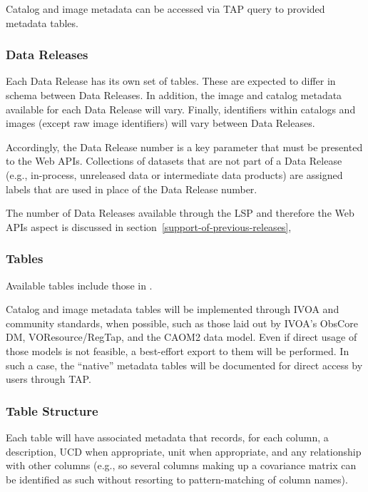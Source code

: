 Catalog and image metadata can be accessed via TAP query to provided
metadata tables.

\subsubsection{Data Releases}\label{data-releases}

Each Data Release has its own set of tables.  These are expected to differ in
schema between Data Releases.  In addition, the image and catalog metadata
available for each Data Release will vary.  Finally, identifiers within
catalogs and images (except raw image identifiers) will vary between Data
Releases.

Accordingly, the Data Release number is a key parameter that must be
presented to the Web APIs.  Collections of datasets that are not part of
a Data Release (e.g., in-process, unreleased data or intermediate data
products) are assigned labels that are used in place of the Data Release
number.

The number of Data Releases available through the LSP and therefore the Web
APIs aspect is discussed in section~\ref{support-of-previous-releases},

\subsubsection{Tables}\label{tables}

Available tables include those in .

Catalog and image metadata tables will be implemented through IVOA and
community standards, when possible, such as those laid out by IVOA's ObsCore
DM, VOResource/RegTap, and the CAOM2 data model. Even if direct usage of those
models is not feasible, a best-effort export to them will be performed.  In
such a case, the ``native'' metadata tables will be documented for direct access
by users through TAP.

\subsubsection{Table Structure}\label{table-structure}

Each table will have associated metadata that records, for each column, a
description, UCD when appropriate, unit when appropriate, and any relationship
with other columns (e.g., so several columns making up a covariance matrix can
be identified as such without resorting to pattern-matching of column names).

